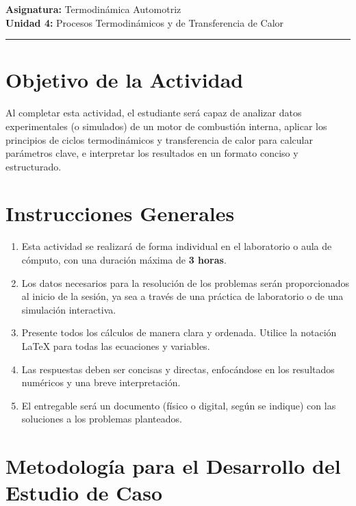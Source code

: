 \documentclass{article}
\begin{document}

\textbf{Asignatura:} Termodinámica Automotriz \\
\textbf{Unidad 4:} Procesos Termodinámicos y de Transferencia de Calor

\vspace{5mm}
\hrule
\vspace{5mm}

\section*{Objetivo de la Actividad}

Al completar esta actividad, el estudiante será capaz de analizar datos experimentales (o simulados) de un motor de combustión interna, aplicar los principios de ciclos termodinámicos y transferencia de calor para calcular parámetros clave, e interpretar los resultados en un formato conciso y estructurado.

\section*{Instrucciones Generales}

\begin{enumerate}
    \item Esta actividad se realizará de forma individual en el laboratorio o aula de cómputo, con una duración máxima de \textbf{3 horas}.
    \item Los datos necesarios para la resolución de los problemas serán proporcionados al inicio de la sesión, ya sea a través de una práctica de laboratorio o de una simulación interactiva.
    \item Presente todos los cálculos de manera clara y ordenada. Utilice la notación LaTeX para todas las ecuaciones y variables.
    \item Las respuestas deben ser concisas y directas, enfocándose en los resultados numéricos y una breve interpretación.
    \item El entregable será un documento (físico o digital, según se indique) con las soluciones a los problemas planteados.
\end{enumerate}

\section*{Metodología para el Desarrollo del Estudio de Caso}
\end{document}
